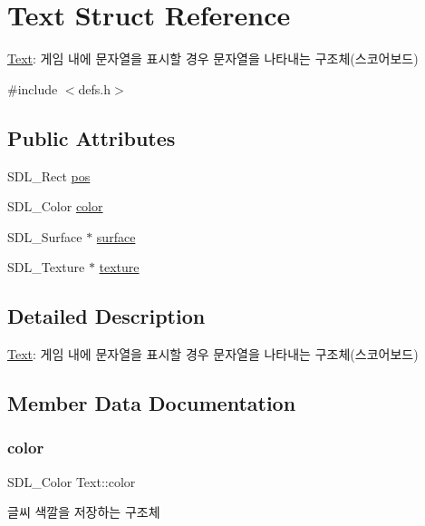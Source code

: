 \hypertarget{struct_text}{}\section{Text Struct Reference}
\label{struct_text}


\hyperlink{struct_text}{Text}\+: 게임 내에 문자열을 표시할 경우 문자열을 나타내는 구조체(스코어보드)  




{\ttfamily \#include $<$defs.\+h$>$}

\subsection*{Public Attributes}
\begin{DoxyCompactItemize}
\item 
S\+D\+L\+\_\+\+Rect \hyperlink{struct_text_a00f108cce0b669d2d7f6c8d5ac16e4d0}{pos}
\item 
S\+D\+L\+\_\+\+Color \hyperlink{struct_text_ab0f771bd18d8e968f7aaee4a4e26e385}{color}
\item 
S\+D\+L\+\_\+\+Surface $\ast$ \hyperlink{struct_text_a881e261364e0678ddcf6865bf9d668b9}{surface}
\item 
S\+D\+L\+\_\+\+Texture $\ast$ \hyperlink{struct_text_aea2a82ef1d8b4d448b6b3e524bce2cc2}{texture}
\end{DoxyCompactItemize}


\subsection{Detailed Description}
\hyperlink{struct_text}{Text}\+: 게임 내에 문자열을 표시할 경우 문자열을 나타내는 구조체(스코어보드) 

\subsection{Member Data Documentation}
\mbox{\label{struct_text_ab0f771bd18d8e968f7aaee4a4e26e385}} 
\subsubsection{\texorpdfstring{color}{color}}
{\footnotesize\ttfamily S\+D\+L\+\_\+\+Color Text\+::color}

글씨 색깔을 저장하는 구조체 \mbox{\label{struct_text_a00f108cce0b669d2d7f6c8d5ac16e4d0}} 
